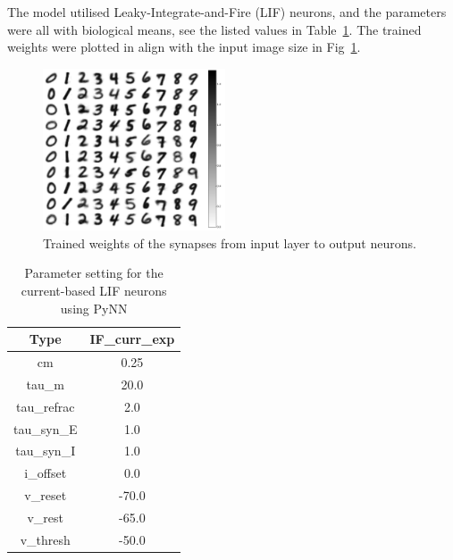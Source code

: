 The model utilised Leaky-Integrate-and-Fire (LIF) neurons, and the parameters were all with biological means, see the listed values in Table~\ref{tbl:pynnSetting}.
The trained weights were plotted in align with the input image size in Fig~\ref{Fig:weight}.
\begin{figure}[hbt!]
	\centering
	\includegraphics[width=0.48\textwidth]{images/weight_r.pdf}
	\caption{Trained weights of the synapses from input layer to output neurons.}
	\label{Fig:weight}
\end{figure}  

\begin{table}[hbbp]
\centering
\caption{\label{tbl:pynnSetting}Parameter setting for the current-based LIF neurons using PyNN}
\begin{tabular}{c|c}
\hline
Type & IF\_curr\_exp\\
\hline
cm & 0.25	\\
\hline
tau\_m & 20.0\\
\hline
tau\_refrac & 2.0\\
\hline
tau\_syn\_E & 1.0\\
\hline
tau\_syn\_I & 1.0\\
\hline
i\_offset & 0.0\\
\hline
v\_reset & -70.0\\
\hline
v\_rest & -65.0\\
\hline
v\_thresh & -50.0\\
\hline
\end{tabular}
\end{table}

